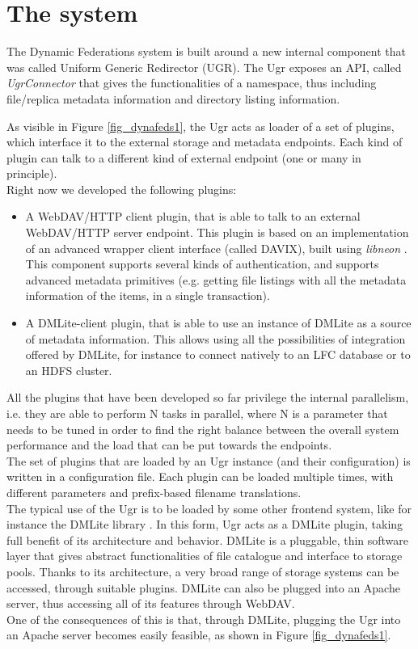 \documentclass[12pt]{article} %
\begin{document}
\section{The system}

The Dynamic Federations system is built around a new internal component that was called Uniform Generic Redirector (UGR). The Ugr exposes an API, called \textit{UgrConnector} that gives the functionalities of a namespace, thus including file/replica metadata information and directory listing information.

As visible in Figure \ref{fig_dynafeds1}, the Ugr acts as loader of a set of plugins, which interface it to the external storage and metadata endpoints. Each kind of plugin can talk to a different kind of external endpoint (one or many in principle).\\ Right now we developed the following plugins:

\begin{itemize}
\item A WebDAV/HTTP client plugin, that is able to talk to an external WebDAV/HTTP server endpoint. This plugin is based on an implementation of an advanced wrapper client interface (called DAVIX), built using \textit{libneon} \cite{libneon}. This component supports several kinds of authentication, and supports advanced metadata primitives (e.g. getting file listings with all the metadata information of the items, in a single transaction). 
\item A DMLite-client plugin, that is able to use an instance of DMLite as a source of metadata information. This allows using all the possibilities of integration offered by DMLite, for instance to connect natively to an LFC database or to an HDFS cluster.
\end{itemize}
All the plugins that have been developed so far privilege the internal parallelism, i.e. they are able to perform N tasks in parallel, where N is a parameter that needs to be tuned in order to find the right balance between the overall system performance and the load that can be put towards the endpoints.\\
The set of plugins that are loaded by an Ugr instance (and their configuration) is written in a configuration file. Each plugin can be loaded multiple times, with different parameters and prefix-based filename translations.\\

The typical use of the Ugr is to be loaded by some other frontend system, like for instance the DMLite library \cite{dpmnew}. In this form, Ugr acts as a DMLite plugin, taking full benefit of its architecture and behavior. DMLite is a pluggable, thin software layer that gives abstract functionalities of file catalogue and interface to storage pools. Thanks to its architecture, a very broad range of storage systems can be accessed, through suitable plugins. DMLite can also be plugged into an Apache server, thus accessing all of its features through WebDAV.\\
One of the consequences of this is that, through DMLite, plugging the Ugr into an Apache server becomes easily feasible, as shown in Figure \ref{fig_dynafeds1}.\\
\end{document}
